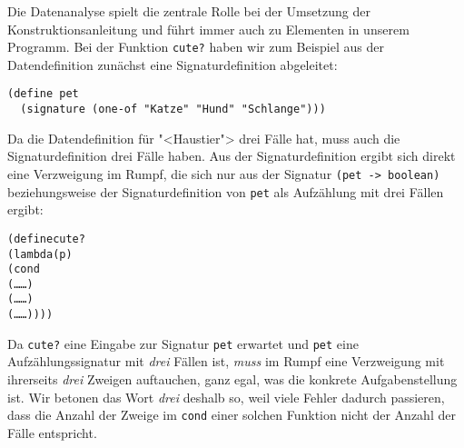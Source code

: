 Die Datenanalyse spielt die zentrale Rolle bei der Umsetzung der
Konstruktionsanleitung und führt immer auch zu Elementen in unserem
Programm.  Bei der Funktion \texttt{cute?} haben wir zum Beispiel
aus der Datendefinition zunächst eine Signaturdefinition abgeleitet:
%
\begin{verbatim}
(define pet
  (signature (one-of "Katze" "Hund" "Schlange")))
\end{verbatim}
%
Da die Datendefinition für "<Haustier"> drei Fälle hat, muss auch die
Signaturdefinition drei Fälle haben.  Aus der Signaturdefinition
ergibt sich direkt eine Verzweigung im Rumpf, die sich nur aus der
Signatur \texttt{(pet -> boolean)} beziehungsweise der
Signaturdefinition von \texttt{pet} als Aufzählung mit drei Fällen
ergibt:
%
\begin{alltt}
(define cute?
  (lambda (p)
    (cond
      (\ldots{} \ldots)
      (\ldots{} \ldots)
      (\ldots{} \ldots))))
\end{alltt}
%
Da \texttt{cute?} eine Eingabe zur Signatur \texttt{pet} erwartet und
\texttt{pet} eine Aufzählungssignatur mit \emph{drei} Fällen ist, \emph{muss}
im Rumpf eine Verzweigung mit ihrerseits \emph{drei} Zweigen
auftauchen, ganz egal, was die konkrete Aufgabenstellung ist.  Wir
betonen das Wort \emph{drei} deshalb so, weil viele Fehler dadurch
passieren, dass die Anzahl der Zweige im \texttt{cond} einer solchen
Funktion nicht der Anzahl der Fälle entspricht.

